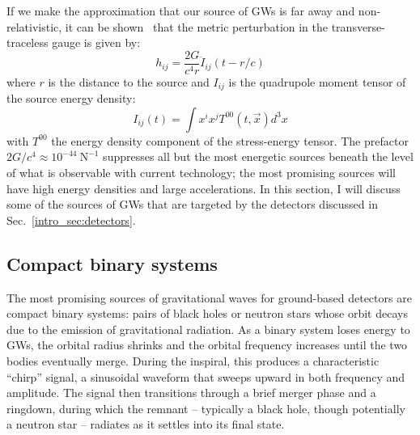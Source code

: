 \begin{refsection}
If we make the approximation that our source of GWs is far away and non-relativistic, it can be shown~\cite{MTW1973} that the metric perturbation in the transverse-traceless gauge is given by:
\begin{equation}
    \label{eq:quad}
    h_{ij} = \frac{2G}{c^4 r} \ddot{I}_{ij}(t - r/c)
\end{equation}
where $r$ is the distance to the source and $I_{ij}$ is the quadrupole moment tensor of the source energy density:
\begin{equation}
    I_{ij}(t) = \int x^i x^j T^{00}(t, \vec{x}) d^3x
\end{equation}
with $T^{00}$ the energy density component of the stress-energy tensor.
The prefactor $2G/c^4 \approx 10^{-44}\ \mathrm{N}^{-1}$ suppresses all but the most energetic sources beneath the level of what is observable with current technology; the most promising sources will have high energy densities and large accelerations.
In this section, I will discuss some of the sources of GWs that are targeted by the detectors discussed in Sec.~\ref{intro_sec:detectors}.

\subsection{Compact binary systems}

The most promising sources of gravitational waves for ground-based detectors are compact binary systems: pairs of black holes or neutron stars whose orbit decays due to the emission of gravitational radiation.
As a binary system loses energy to GWs, the orbital radius shrinks and the orbital frequency increases until the two bodies eventually merge.
During the inspiral, this produces a characteristic ``chirp'' signal, a sinusoidal waveform that sweeps upward in both frequency and amplitude.
The signal then transitions through a brief merger phase and a ringdown, during which the remnant -- typically a black hole, though potentially a neutron star -- radiates as it settles into its final state.


\end{refsection}
